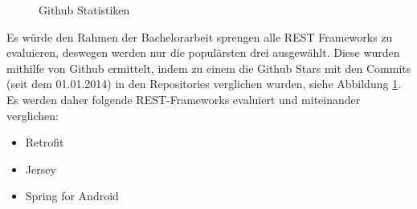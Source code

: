\documentclass[a4paper,11pt,german,public]{INSOexpose}
\begin{document}
\begin{figure}[!htbp]
	\centering	
	\caption{Github Statistiken}	
	\label{figure:github}
\end{figure}

Es würde den Rahmen der Bachelorarbeit sprengen alle REST Frameworks zu evaluieren, deswegen werden nur die populärsten drei ausgewählt. Diese wurden mithilfe von Github ermittelt, indem zu einem die Github Stars mit den Commits (seit dem 01.01.2014)  in den Repositories verglichen wurden, siehe Abbildung \ref{figure:github}. Es werden daher folgende REST-Frameworks evaluiert und miteinander verglichen:

\begin{itemize}
	\item Retrofit 
	\item Jersey
	\item Spring for Android
\end{itemize}

\end{document}
